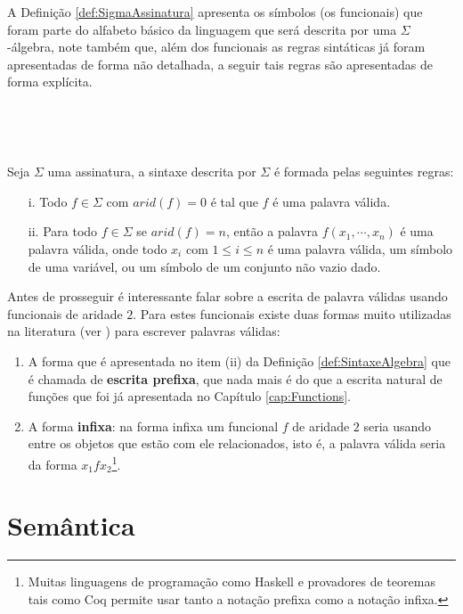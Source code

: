 A Definição \ref{def:SigmaAssinatura} apresenta os símbolos (os funcionais) que foram parte do alfabeto básico da linguagem que será descrita por uma $\Sigma$-álgebra, note também que, além dos funcionais as regras sintáticas já foram apresentadas de forma não detalhada, a seguir tais regras são apresentadas de forma explícita.

\

\

\begin{definicao}\label{def:SintaxeAlgebra}
  Seja $\Sigma$ uma assinatura, a sintaxe descrita por $\Sigma$ é formada pelas seguintes regras: 
  \begin{itemize}
    \item[i.] Todo $f \in \Sigma$ com $arid(f) = 0$ é tal que $f$ é uma palavra válida.
    \item[ii.] Para todo $f \in \Sigma$ se $arid(f) = n$, então a palavra $f(x_1, \cdots, x_n)$ é uma palavra válida, onde todo $x_i$ com $1 \leq i \leq n$ é uma palavra válida, um símbolo de uma variável, ou um símbolo de um conjunto não vazio dado.
  \end{itemize}
\end{definicao}

Antes de prosseguir é interessante falar sobre a escrita de palavra válidas usando funcionais de aridade $2$. Para estes funcionais existe duas formas muito utilizadas na literatura (ver \cite{klaus2001, stanley1981}) para escrever palavras válidas: 

\begin{enumerate}
  \item A forma que é apresentada no item (ii) da Definição \ref{def:SintaxeAlgebra} que é chamada de \textbf{escrita prefixa}, que nada mais é do que a escrita natural de funções que foi já apresentada no Capítulo \ref{cap:Functions}. 
  \item A forma \textbf{infixa}: na forma infixa um funcional $f$ de aridade $2$ seria usando entre os objetos que estão com ele relacionados, isto é, a palavra válida seria da forma $x_1 f x_2$\footnote{Muitas linguagens de programação como Haskell \cite{learnHaskell2011, beginningHaskell} e provadores de teoremas tais como Coq \cite{coq2013} permite usar tanto a notação prefixa como a notação infixa.}.
\end{enumerate}

\section{Semântica}\label{sec:AlgebraSematics}

